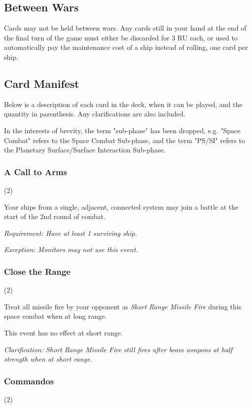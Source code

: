 \subsection{Between Wars}

Cards may not be held between wars. Any cards still in your hand at the end of the final turn of the game must either be discarded for 3 RU each, or used to automatically pay the maintenance cost of a ship instead of rolling, one card per ship.

\subsection{Card Manifest}

Below is a description of each card in the deck, when it can be played, and the quantity in parenthesis. Any clarifications are also included.

In the interests of brevity, the term "sub-phase" has been dropped, e.g. "Space Combat" refers to the Space Combat Sub-phase, and the term "PS/SI" refers to the Planetary Surface/Surface Interaction Sub-phase.

\subsubsection{A Call to Arms} (2)


Your ships from a single, adjacent, connected system may join a battle at the start of the 2nd round of combat.

\textit{Requirement: Have at least 1 surviving ship.}

\textit{Exception: Monitors may not use this event.}

\subsubsection{Close the Range} (2)


Treat all missile fire by your opponent as \textit{Short Range Missile Fire} during this space combat when at long range.

This event has no effect at short range.

\textit{Clarification: Short Range Missile Fire still fires after beam weapons at half strength when at short range.}

\subsubsection{Commandos} (2)

